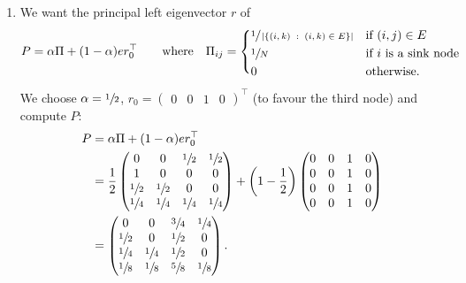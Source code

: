 \begin{enumerate}

  \item We want the principal left eigenvector $r$ of
  \begin{align*}
    P = \alpha\Pi + (1-\alpha) er_0^\top\quad\quad\text{where}\quad
    \Pi_{ij} =
    \begin{cases*}
      \sfrac{1}{\left|\left\{(i,k)\;:\;(i,k)\in E\right\}\right|}
        & if $(i,j) \in E$ \\
      \sfrac{1}{N} & if $i$ is a sink node \\
      0 & otherwise.
    \end{cases*}
  \end{align*}

  We choose $\alpha=\sfrac{1}{2}$, $r_0 =
  \begin{pmatrix}0&0&1&0\end{pmatrix}^\top$ (to favour the third node) and compute
  $P$:
  \begin{align*}
    P &=  \alpha\Pi + (1-\alpha) er_0^\top \\
      &=
          \frac{1}{2}
          \begin{pmatrix}
            0&0&\sfrac{1}{2}&\sfrac{1}{2} \\
            1&0&0&0 \\
            \sfrac{1}{2}&\sfrac{1}{2}&0&0 \\
            \sfrac{1}{4}&\sfrac{1}{4}&\sfrac{1}{4}&\sfrac{1}{4}
          \end{pmatrix}
          +
          \left(1-\frac{1}{2}\right)
          \begin{pmatrix}
            0&0&1&0 \\
            0&0&1&0 \\
            0&0&1&0 \\
            0&0&1&0
          \end{pmatrix} \\
      &=
          \begin{pmatrix}
            0&0&\sfrac{3}{4}&\sfrac{1}{4} \\
            \sfrac{1}{2}&0&\sfrac{1}{2}&0 \\
            \sfrac{1}{4}&\sfrac{1}{4}&\sfrac{1}{2}&0 \\
            \sfrac{1}{8}&\sfrac{1}{8}&\sfrac{5}{8}&\sfrac{1}{8}
          \end{pmatrix}.
  \end{align*}


\end{enumerate}
